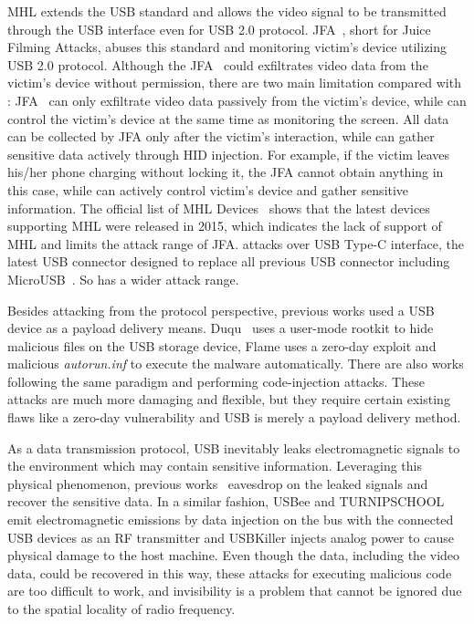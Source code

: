 \ac{MHL} extends the \ac{USB} standard and allows the video signal to
be transmitted through the \ac{USB} interface even for \ac{USB} 2.0 protocol. 
JFA~\cite{JFC}, short for Juice Filming Attacks,
abuses this standard and monitoring victim's device utilizing \ac{USB} 2.0 protocol. Although the JFA~\cite{JFC} could exfiltrates video data from the victim's device without permission,  
there are two main limitation compared with \tool: 
 JFA~\cite{JFC} can only exfiltrate video data passively from the victim's device, while \tool can control the victim's device at the same time as monitoring the screen. All data can be collected by JFA only after the victim's interaction, while \tool can gather sensitive data actively through \ac{HID} injection. For example, if the victim leaves his/her phone charging without locking it, the JFA cannot obtain anything in this case, while \tool can actively control victim's device and gather sensitive information.
 The official list of \ac{MHL} Devices~\cite{MHLlist} shows that the latest devices supporting \ac{MHL} were released in 2015, which indicates the lack of support of \ac{MHL} and limits the attack range of JFA. \tool attacks over \ac{USB} Type-C interface, the latest \ac{USB} connector designed to replace all previous USB connector including MicroUSB~\cite{li2018usb}. So \tool has a wider attack range. 

Besides attacking from the protocol perspective, previous works used a
\ac{USB} device as a payload delivery means. Duqu~\cite{duqu} uses a user-mode
rootkit to hide malicious files on the \ac{USB} storage device, Flame\cite{flame} uses a
zero-day exploit and malicious \textit{autorun.inf} to execute the malware
automatically. There are also works \cite{brain,stuxnet,conficker}
following the same paradigm and performing code-injection attacks. These
attacks are much more damaging and flexible,
but they require certain existing flaws like a zero-day vulnerability\cite{zero-day}  and \ac{USB} is merely
a payload delivery method.

As a data transmission protocol, \ac{USB} inevitably leaks electromagnetic signals
to the environment which may contain sensitive information. Leveraging this
physical phenomenon, previous works~\cite{smartphone,
poweremi,revealing,su2017usb,usbgpslocator,bates2014leveraging,badusbhub,usbfinger,side,usbdriver}
eavesdrop on the leaked signals and recover the sensitive data. In a similar fashion, USBee\cite{usbee} and TURNIPSCHOOL\cite{turnip} emit electromagnetic emissions by data injection on the bus
with the connected \ac{USB} devices as an RF transmitter and USBKiller\cite{usbkiller}
injects analog
power to cause physical damage to the host machine. Even though the data,
including the video data, could be recovered in this way, these attacks for
executing malicious code are too difficult to work, and invisibility is a
problem that cannot be ignored due to the spatial locality of radio frequency.

